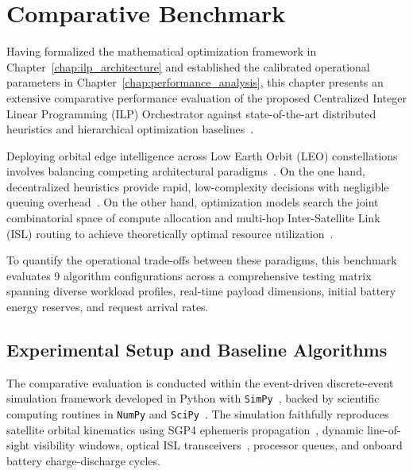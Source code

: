 \chapter{Comparative Benchmark}
\label{chap:comparative_benchmark}

Having formalized the mathematical optimization framework in Chapter~\ref{chap:ilp_architecture} and established the calibrated operational parameters in Chapter~\ref{chap:performance_analysis}, this chapter presents an extensive comparative performance evaluation of the proposed Centralized Integer Linear Programming (ILP) Orchestrator against state-of-the-art distributed heuristics and hierarchical optimization baselines~\cite{icdcs_satellite_2025}.

Deploying orbital edge intelligence across Low Earth Orbit (LEO) constellations involves balancing competing architectural paradigms~\cite{denby2019orbital, denby2020asplos, survey_orbital_edge_2023}. On the one hand, decentralized heuristics provide rapid, low-complexity decisions with negligible queuing overhead~\cite{icdcs_satellite_2025}. On the other hand, optimization models search the joint combinatorial space of compute allocation and multi-hop Inter-Satellite Link (ISL) routing to achieve theoretically optimal resource utilization~\cite{wolsey1998integer, zhong2025leo}.

To quantify the operational trade-offs between these paradigms, this benchmark evaluates 9 algorithm configurations across a comprehensive testing matrix spanning diverse workload profiles, real-time payload dimensions, initial battery energy reserves, and request arrival rates.

\section{Experimental Setup and Baseline Algorithms}
\label{sec:bench_setup}

The comparative evaluation is conducted within the event-driven discrete-event simulation framework developed in Python with \texttt{SimPy}~\cite{simpy2023}, backed by scientific computing routines in \texttt{NumPy} and \texttt{SciPy}~\cite{harris2020numpy, virtanen2020scipy}. The simulation faithfully reproduces satellite orbital kinematics using SGP4 ephemeris propagation~\cite{vallado2006sgp4}, dynamic line-of-sight visibility windows, optical ISL transceivers~\cite{chen2021isl, chaudhry2021laser}, processor queues, and onboard battery charge-discharge cycles.

